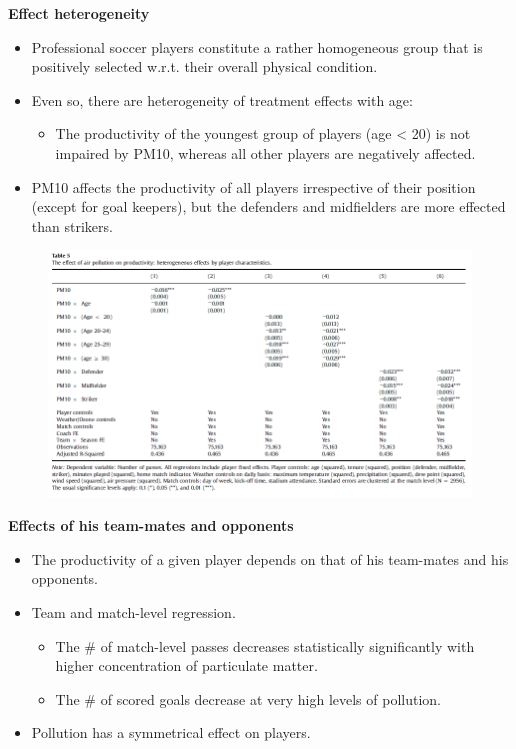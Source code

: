 \documentclass[../root]{subfiles}
\begin{document}
    \textbf{Effect heterogeneity}

    \begin{itemize}
      \item Professional soccer players constitute a rather homogeneous group that is positively selected w.r.t. their overall physical condition.
      \item Even so, there are heterogeneity of treatment effects with age:
      \begin{itemize}
        \item The productivity of the youngest group of players (age < 20) is not impaired by PM10, whereas all other players are negatively affected.
      \end{itemize}
      \item PM10 affects the productivity of all players irrespective of their position (except for goal keepers), but the defenders and midfielders are more effected than strikers.
    \end{itemize}

    \begin{figure}[H]
      \centering
      \includegraphics[scale = 1]{0522tanji/t5}
      \label{t5}
    \end{figure}

    \textbf{Effects of his team-mates and opponents}

    \begin{itemize}
      \item The productivity of a given player depends on that of his team-mates and his opponents.
      \item Team and match-level regression.
      \begin{itemize}
        \item The \# of match-level passes decreases statistically significantly with higher concentration of particulate matter.
        \item The \# of scored goals decrease at very high levels of pollution.
      \end{itemize}
      \item Pollution has a symmetrical effect on players.
    \end{itemize}
\end{document}
